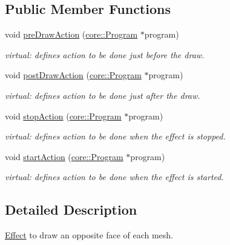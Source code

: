 \subsection*{Public Member Functions}
\begin{DoxyCompactItemize}
\item 
void \hyperlink{classfillwave_1_1effects_1_1ClockwiseDrawEffect_a0aa6fa5faf4d87d9defc4039f17fe615}{pre\+Draw\+Action} (\hyperlink{classfillwave_1_1core_1_1Program}{core\+::\+Program} $\ast$program)
\begin{DoxyCompactList}\small\item\em virtual\+: defines action to be done just before the draw. \end{DoxyCompactList}\item 
void \hyperlink{classfillwave_1_1effects_1_1ClockwiseDrawEffect_a1565a96fe8744c414bfb0a082adce1d3}{post\+Draw\+Action} (\hyperlink{classfillwave_1_1core_1_1Program}{core\+::\+Program} $\ast$program)
\begin{DoxyCompactList}\small\item\em virtual\+: defines action to be done just after the draw. \end{DoxyCompactList}\item 
void \hyperlink{classfillwave_1_1effects_1_1ClockwiseDrawEffect_af496a94f611f378e365f0f56130201a9}{stop\+Action} (\hyperlink{classfillwave_1_1core_1_1Program}{core\+::\+Program} $\ast$program)
\begin{DoxyCompactList}\small\item\em virtual\+: defines action to be done when the effect is stopped. \end{DoxyCompactList}\item 
void \hyperlink{classfillwave_1_1effects_1_1ClockwiseDrawEffect_a793f6c4d14c18bc366a17892d7764da8}{start\+Action} (\hyperlink{classfillwave_1_1core_1_1Program}{core\+::\+Program} $\ast$program)
\begin{DoxyCompactList}\small\item\em virtual\+: defines action to be done when the effect is started. \end{DoxyCompactList}\end{DoxyCompactItemize}


\subsection{Detailed Description}
\hyperlink{classfillwave_1_1effects_1_1Effect}{Effect} to draw an opposite face of each mesh. 

